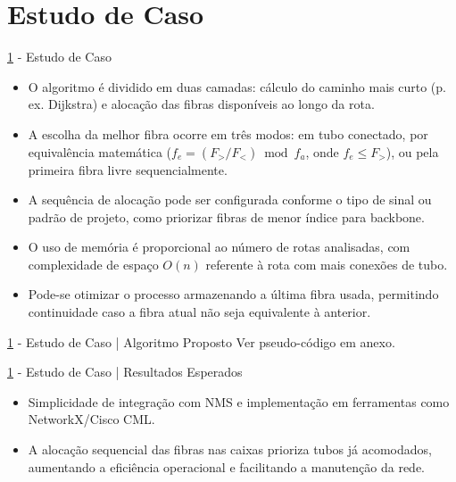 \documentclass[aspectratio=169,xcolor=dvipsnames]{beamer}
\begin{document}
\section{Estudo de Caso}\label{sec:estudo_de_caso}
\begin{frame}{\ref{sec:estudo_de_caso} - Estudo de Caso}
  \begin{itemize}
    \item O algoritmo é dividido em duas camadas: cálculo do caminho mais curto (p. ex. Dijkstra) e alocação das fibras disponíveis ao longo da rota.
    \item A escolha da melhor fibra ocorre em três modos: em tubo conectado, por equivalência matemática ($f_e = (F_{>} / {F_{<}}) \bmod f_{a}$, onde $f_{e} \leq F_{>}$), ou pela primeira fibra livre sequencialmente.
    \item A sequência de alocação pode ser configurada conforme o tipo de sinal ou padrão de projeto, como priorizar fibras de menor índice para backbone.
    \item O uso de memória é proporcional ao número de rotas analisadas, com complexidade de espaço $O(n)$ referente à rota com mais conexões de tubo.
    \item Pode-se otimizar o processo armazenando a última fibra usada, permitindo continuidade caso a fibra atual não seja equivalente à anterior.
  \end{itemize}
\end{frame}

\begin{frame}{\ref{sec:estudo_de_caso} - Estudo de Caso | Algoritmo Proposto}
  Ver pseudo-código em anexo.
\end{frame}

\begin{frame}{\ref{sec:estudo_de_caso} - Estudo de Caso | Resultados Esperados}
  \begin{itemize}
    \item Simplicidade de integração com NMS e implementação em ferramentas como NetworkX/Cisco CML. \item A alocação sequencial das fibras nas caixas prioriza tubos já acomodados, aumentando a eficiência operacional e facilitando a manutenção da rede.
  \end{itemize}

\end{frame}
\end{document}
